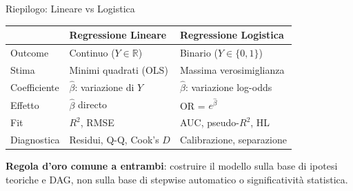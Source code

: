 \documentclass[
  ignorenonframetext,
]{beamer}
\begin{document}
\begin{frame}{Riepilogo: Lineare vs Logistica}
\label{riepilogo-lineare-vs-logistica}
\begin{center}
\begin{tabular}{>{\small}l >{\small}l >{\small}l}
\toprule
 & \textbf{Regressione Lineare} & \textbf{Regressione Logistica} \\
\midrule
Outcome    & Continuo ($Y \in \mathbb{R}$) & Binario ($Y \in \{0,1\}$) \\
Stima      & Minimi quadrati (OLS) & Massima verosimiglianza \\
Coefficiente & $\hat{\beta}$: variazione di $Y$ & $\hat{\beta}$: variazione log-odds \\
Effetto    & $\hat{\beta}$ directo & OR = $e^{\hat{\beta}}$ \\
Fit        & $R^2$, RMSE & AUC, pseudo-$R^2$, HL \\
Diagnostica & Residui, Q-Q, Cook's $D$ & Calibrazione, separazione \\
\bottomrule
\end{tabular}
\end{center}
\vspace{0.5em}
\small \textbf{Regola d'oro comune a entrambi}: costruire il modello sulla base di ipotesi teoriche e DAG, non sulla base di stepwise automatico o significatività statistica.
\end{frame}
\end{document}
